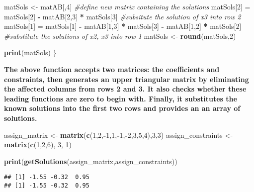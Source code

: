 \documentclass[
]{article}
\newenvironment{Shaded}{\begin{snugshade}}{\end{snugshade}}
\newcommand{\CommentTok}[1]{\textcolor[rgb]{0.56,0.35,0.01}{\textit{#1}}}
\newcommand{\DecValTok}[1]{\textcolor[rgb]{0.00,0.00,0.81}{#1}}
\newcommand{\KeywordTok}[1]{\textcolor[rgb]{0.13,0.29,0.53}{\textbf{#1}}}
\newcommand{\NormalTok}[1]{#1}
\newcommand{\OperatorTok}[1]{\textcolor[rgb]{0.81,0.36,0.00}{\textbf{#1}}}
\newcommand{\StringTok}[1]{\textcolor[rgb]{0.31,0.60,0.02}{#1}}
\begin{document}
\begin{Shaded}
\begin{Highlighting}[]
\NormalTok{  matSols \textless{}{-}}\StringTok{ }\NormalTok{matAB[,}\DecValTok{4}\NormalTok{] }\CommentTok{\#define new matrix containing the solutions}
\NormalTok{  matSols[}\DecValTok{2}\NormalTok{] =}\StringTok{ }\NormalTok{matSols[}\DecValTok{2}\NormalTok{] }\OperatorTok{{-}}\StringTok{ }\NormalTok{matAB[}\DecValTok{2}\NormalTok{,}\DecValTok{3}\NormalTok{] }\OperatorTok{*}\StringTok{ }\NormalTok{matSols[}\DecValTok{3}\NormalTok{] }\CommentTok{\#subsitute the solution of x3 into row 2}
\NormalTok{  matSols[}\DecValTok{1}\NormalTok{] =}\StringTok{ }\NormalTok{matSols[}\DecValTok{1}\NormalTok{] }\OperatorTok{{-}}\StringTok{ }\NormalTok{matAB[}\DecValTok{1}\NormalTok{,}\DecValTok{3}\NormalTok{] }\OperatorTok{*}\StringTok{ }\NormalTok{matSols[}\DecValTok{3}\NormalTok{] }\OperatorTok{{-}}\StringTok{ }\NormalTok{matAB[}\DecValTok{1}\NormalTok{,}\DecValTok{2}\NormalTok{] }\OperatorTok{*}\StringTok{ }\NormalTok{matSols[}\DecValTok{2}\NormalTok{] }\CommentTok{\#substitute the solutions of x2, x3 into row 1}
\NormalTok{  matSols \textless{}{-}}\StringTok{ }\KeywordTok{round}\NormalTok{(matSols,}\DecValTok{2}\NormalTok{)}

  \KeywordTok{print}\NormalTok{(matSols)}
\NormalTok{\}}
\end{Highlighting}
\end{Shaded}

\textbf{The above function accepts two matrices: the coefficients and
constraints, then generates an upper triangular matrix by eliminating
the affected columns from rows 2 and 3. It also checks whether these
leading functions are zero to begin with. Finally, it substitutes the
known solutions into the first two rows and provides an an array of
solutions.}

\begin{Shaded}
\begin{Highlighting}[]
\NormalTok{assign\_matrix \textless{}{-}}\StringTok{ }\KeywordTok{matrix}\NormalTok{(}\KeywordTok{c}\NormalTok{(}\DecValTok{1}\NormalTok{,}\DecValTok{2}\NormalTok{,}\OperatorTok{{-}}\DecValTok{1}\NormalTok{,}\DecValTok{1}\NormalTok{,}\OperatorTok{{-}}\DecValTok{1}\NormalTok{,}\OperatorTok{{-}}\DecValTok{2}\NormalTok{,}\DecValTok{3}\NormalTok{,}\DecValTok{5}\NormalTok{,}\DecValTok{4}\NormalTok{),}\DecValTok{3}\NormalTok{,}\DecValTok{3}\NormalTok{)}
\NormalTok{assign\_constraints \textless{}{-}}\StringTok{ }\KeywordTok{matrix}\NormalTok{(}\KeywordTok{c}\NormalTok{(}\DecValTok{1}\NormalTok{,}\DecValTok{2}\NormalTok{,}\DecValTok{6}\NormalTok{), }\DecValTok{3}\NormalTok{, }\DecValTok{1}\NormalTok{)}


\KeywordTok{print}\NormalTok{(}\KeywordTok{getSolutions}\NormalTok{(assign\_matrix,assign\_constraints))}
\end{Highlighting}
\end{Shaded}

\begin{verbatim}
## [1] -1.55 -0.32  0.95
## [1] -1.55 -0.32  0.95
\end{verbatim}
\end{document}
